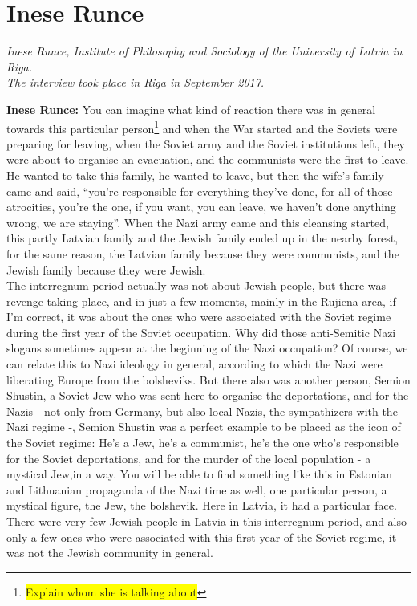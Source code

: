 \section{Inese Runce}

\textit{Inese Runce, Institute of Philosophy and Sociology of the University of Latvia in Riga.\\ 
The interview took place in Riga in September 2017.}\par
\vspace*{2em}
\textbf{Inese Runce:} You can imagine what kind of reaction there was in general towards this particular person\footnote{\colorbox{yellow}{Explain whom she is talking about}} and when the War started and the Soviets were preparing for leaving, when the Soviet army and the Soviet institutions left, they were about to organise an evacuation, and the communists were the first to leave.  He wanted to take this family, he wanted to leave, but then the wife's family came and said, ``you're responsible for everything they've done, for all of those atrocities, you're the one, if you want, you can leave, we haven't done anything wrong, we are staying''. When the Nazi army came and this cleansing started, this partly Latvian family and the Jewish family ended up in the nearby forest, for the same reason, the Latvian family because they were communists, and the Jewish family because they were Jewish.\\
The interregnum period actually was not about Jewish people, but there was revenge taking place, and in just a few moments, mainly in the Rūjiena area, if I'm correct, it was about the ones who were associated with the Soviet regime during the first year of the Soviet occupation. Why did those anti-Semitic Nazi slogans sometimes appear at the beginning of the Nazi occupation? Of course, we can relate this to Nazi ideology in general, according to which the Nazi were liberating Europe from the bolsheviks. But there also was another person, Semion Shustin, a Soviet Jew who was sent here to organise the  deportations, and for the Nazis - not only from Germany, but also local Nazis, the sympathizers with the Nazi regime -, Semion Shustin was a perfect example to be placed as the icon of the Soviet regime: He's a Jew, he's a communist, he's the one who's responsible for the Soviet deportations, and for the murder of the local population - a mystical Jew,in a way. You will be able to find something like this in Estonian and Lithuanian propaganda of the Nazi time as well, one particular person, a mystical figure, the Jew, the bolshevik. Here in Latvia, it had a particular face. There were very few Jewish people in Latvia in this interregnum period, and also only a few ones who were associated with this first year of the Soviet regime, it was not the Jewish community in general.
	
